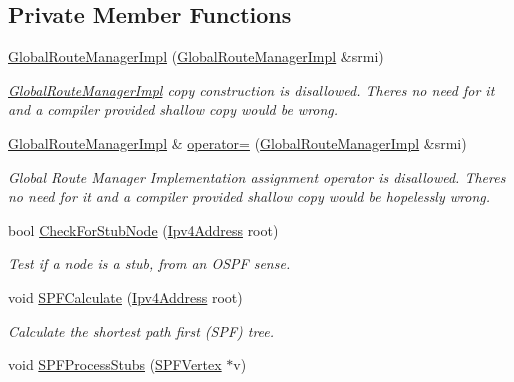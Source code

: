 \subsection*{Private Member Functions}
\begin{DoxyCompactItemize}
\item 
\hyperlink{classns3_1_1GlobalRouteManagerImpl_a74fb1b423c3050cbdd0d9b03e94d3b23}{Global\+Route\+Manager\+Impl} (\hyperlink{classns3_1_1GlobalRouteManagerImpl}{Global\+Route\+Manager\+Impl} \&srmi)
\begin{DoxyCompactList}\small\item\em \hyperlink{classns3_1_1GlobalRouteManagerImpl}{Global\+Route\+Manager\+Impl} copy construction is disallowed. There\textquotesingle{}s no need for it and a compiler provided shallow copy would be wrong. \end{DoxyCompactList}\item 
\hyperlink{classns3_1_1GlobalRouteManagerImpl}{Global\+Route\+Manager\+Impl} \& \hyperlink{classns3_1_1GlobalRouteManagerImpl_aef03d72b95a91f0478916671ede3511b}{operator=} (\hyperlink{classns3_1_1GlobalRouteManagerImpl}{Global\+Route\+Manager\+Impl} \&srmi)
\begin{DoxyCompactList}\small\item\em Global Route Manager Implementation assignment operator is disallowed. There\textquotesingle{}s no need for it and a compiler provided shallow copy would be hopelessly wrong. \end{DoxyCompactList}\item 
bool \hyperlink{classns3_1_1GlobalRouteManagerImpl_a84085f1fc0b4d7c9d18bf0145df3e01c}{Check\+For\+Stub\+Node} (\hyperlink{classns3_1_1Ipv4Address}{Ipv4\+Address} root)
\begin{DoxyCompactList}\small\item\em Test if a node is a stub, from an O\+S\+PF sense. \end{DoxyCompactList}\item 
void \hyperlink{classns3_1_1GlobalRouteManagerImpl_a03cdea3013a73c90ae8d67946b237c45}{S\+P\+F\+Calculate} (\hyperlink{classns3_1_1Ipv4Address}{Ipv4\+Address} root)
\begin{DoxyCompactList}\small\item\em Calculate the shortest path first (S\+PF) tree. \end{DoxyCompactList}\item 
void \hyperlink{classns3_1_1GlobalRouteManagerImpl_a3d43e1ea8faefbbb7139b2ede6315cbb}{S\+P\+F\+Process\+Stubs} (\hyperlink{classns3_1_1SPFVertex}{S\+P\+F\+Vertex} $\ast$v)

\end{DoxyCompactItemize}
